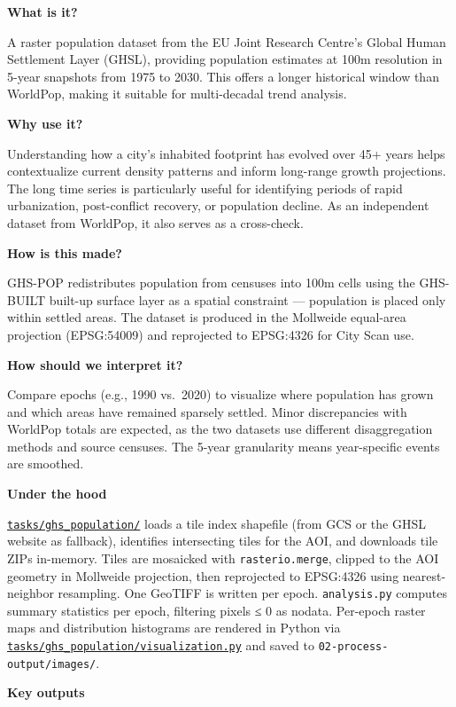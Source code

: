 \documentclass[
  letterpaper,
  DIV=11,
  numbers=noendperiod]{scrreprt}
\begin{document}
\textbf{What is it?}

A raster population dataset from the EU Joint Research Centre's Global
Human Settlement Layer (GHSL), providing population estimates at 100m
resolution in 5-year snapshots from 1975 to 2030. This offers a longer
historical window than WorldPop, making it suitable for multi-decadal
trend analysis.

\textbf{Why use it?}

Understanding how a city's inhabited footprint has evolved over 45+
years helps contextualize current density patterns and inform long-range
growth projections. The long time series is particularly useful for
identifying periods of rapid urbanization, post-conflict recovery, or
population decline. As an independent dataset from WorldPop, it also
serves as a cross-check.

\textbf{How is this made?}

GHS-POP redistributes population from censuses into 100m cells using the
GHS-BUILT built-up surface layer as a spatial constraint --- population
is placed only within settled areas. The dataset is produced in the
Mollweide equal-area projection (EPSG:54009) and reprojected to
EPSG:4326 for City Scan use.

\textbf{How should we interpret it?}

Compare epochs (e.g., 1990 vs.~2020) to visualize where population has
grown and which areas have remained sparsely settled. Minor
discrepancies with WorldPop totals are expected, as the two datasets use
different disaggregation methods and source censuses. The 5-year
granularity means year-specific events are smoothed.

\textbf{Under the hood}

\href{../tasks/ghs_population/}{\texttt{tasks/ghs\_population/}} loads a
tile index shapefile (from GCS or the GHSL website as fallback),
identifies intersecting tiles for the AOI, and downloads tile ZIPs
in-memory. Tiles are mosaicked with \texttt{rasterio.merge}, clipped to
the AOI geometry in Mollweide projection, then reprojected to EPSG:4326
using nearest-neighbor resampling. One GeoTIFF is written per epoch.
\texttt{analysis.py} computes summary statistics per epoch, filtering
pixels ≤ 0 as nodata. Per-epoch raster maps and distribution histograms
are rendered in Python via
\href{../tasks/ghs_population/visualization.py}{\texttt{tasks/ghs\_population/visualization.py}}
and saved to \texttt{02-process-output/images/}.

\textbf{Key outputs}
\end{document}
